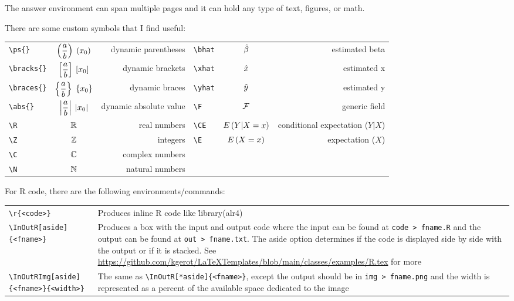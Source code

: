 \documentclass{gerot-assignment}
\begin{document}
\begin{answer}
    The answer environment can span multiple pages and it can hold any type of text, figures, or math.
    
    \vspace*{2em}
    
    There are some custom symbols that I find useful:
    
    \begin{tabular}{lcr|lcr}
        \verb|\ps{}| & $\displaystyle\left(\frac{a}{b}\right)$ $\left(x_0\right)$ & dynamic parentheses
        &\verb|\bhat| & $\hat{\beta}$ & estimated beta\\[6pt]
        \verb|\bracks{}| & $\displaystyle\left[\frac{a}{b}\right]$ $\left[x_0\right]$ & dynamic brackets
        &\verb|\xhat| & $\hat{x}$ & estimated x\\[6pt]
        \verb|\braces{}| & $\displaystyle\left\{\frac{a}{b}\right\}$ $\left\{x_0\right\}$ & dynamic braces
        &\verb|\yhat| & $\hat{y}$ & estimated y\\[6pt]
        \verb|\abs{}| & $\displaystyle\left|\frac{a}{b}\right|$ $\left|x_0\right|$ & dynamic absolute value
        &\verb|\F| & $\mathcal{F}$ & generic field\\
        \verb|\R| & $\mathbb{R}$ & real numbers
        &\verb|\CE| & $E\left(Y|X=x\right)$ & conditional expectation ($Y|X$)\\
        \verb|\Z| & $\mathbb{Z}$ & integers
        &\verb|\E| & $E\left(X=x\right)$ & expectation ($X$)\\
        \verb|\C| & $\mathbb{C}$ & complex numbers\\
        \verb|\N| & $\mathbb{N}$ & natural numbers\\
    \end{tabular}
    
    \vspace*{2em}
    
    For R code, there are the following environments/commands:
    
    \begin{tabular}{p{}p{}}
        \verb|\r{<code>}| & Produces inline R code like \r{library(alr4)}\\[3pt]
        \verb|\InOutR[aside]{<fname>}| &
        Produces a box with the input and output code where the input can be found at \texttt{code > fname.R} and the output can be found at \texttt{out > fname.txt}. The aside option determines if the code is displayed side by side with the output or if it is stacked. See \url{https://github.com/kgerot/LaTeXTemplates/blob/main/classes/examples/R.tex} for more\\
        \verb|\InOutRImg[aside]{<fname>}{<width>}| & The same as \verb|\InOutR[*aside]{<fname>}|, except the output should be in \texttt{img > fname.png} and the width is represented as a percent of the available space dedicated to the image
    \end{tabular}
\end{answer}
\end{document}
